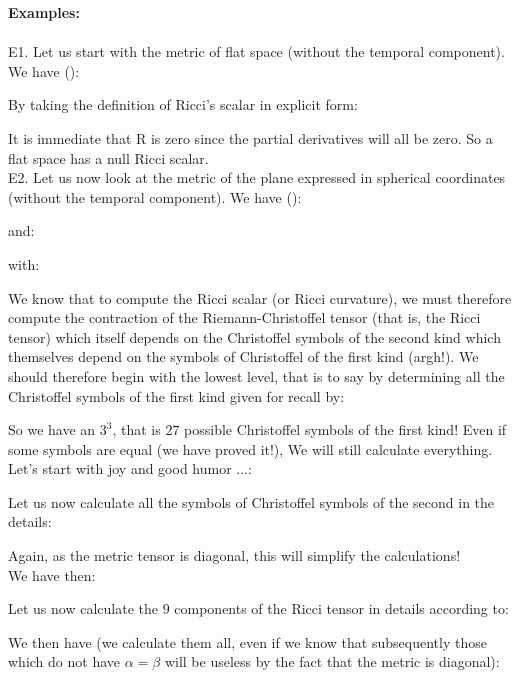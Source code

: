 	\begin{tcolorbox}[colframe=black,colback=white,sharp corners]
	\textbf{{\Large {}}Examples:}\\\\
	E1. Let us start with the metric of flat space (without the temporal component). We have ():
	
	By taking the definition of Ricci's scalar in explicit form:
	
	It is immediate that R is zero since the partial derivatives will all be zero. So a flat space has a null Ricci scalar.\\
	
	E2. Let us now look at the metric of the plane expressed in spherical coordinates (without the temporal component). We have ():
	
	and:
	
	with:
	
	We know that to compute the Ricci scalar (or Ricci curvature), we must therefore compute the contraction of the Riemann-Christoffel tensor (that is, the Ricci tensor) which itself depends on the Christoffel symbols of the second kind which themselves depend on the symbols of Christoffel of the first kind (argh!). We should therefore begin with the lowest level, that is to say by determining all the Christoffel symbols of the first kind given for recall by:
	
	
	\end{tcolorbox}
	\begin{tcolorbox}[colframe=black,colback=white,sharp corners]
	So we have an $3^3$, that is $27$ possible Christoffel symbols of the first kind! Even if some symbols are equal (we have proved it!), We will still calculate everything.\\

	Let's start with joy and good humor ...:
	
	\end{tcolorbox}
	
	\begin{tcolorbox}[colframe=black,colback=white,sharp corners]
	
	Let us now calculate all the symbols of Christoffel symbols of the second in the details:
	
	Again, as the metric tensor is diagonal, this will simplify the calculations!\\

	We have then:
	
	\end{tcolorbox}
	\begin{tcolorbox}[colframe=black,colback=white,sharp corners]
	Let us now calculate the $9$ components of the Ricci tensor in details according to:
	
	We then have (we calculate them all, even if we know that subsequently those which do not have $\alpha=\beta$ will be useless by the fact that the metric is diagonal):
	
	\end{tcolorbox}
	
